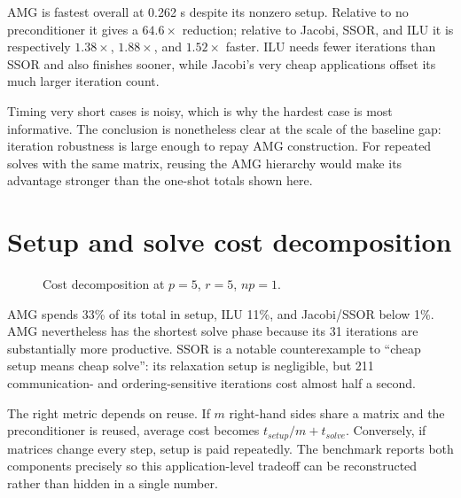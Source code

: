 \documentclass[10pt,a4paper]{article}
\begin{document}
AMG is fastest overall at 0.262 s despite its nonzero setup. Relative to no preconditioner it gives
a $64.6\times$ reduction; relative to Jacobi, SSOR, and ILU it is respectively $1.38\times$,
$1.88\times$, and $1.52\times$ faster. ILU needs fewer iterations than SSOR and also finishes
sooner, while Jacobi's very cheap applications offset its much larger iteration count.

Timing very short cases is noisy, which is why the hardest case is most informative. The conclusion
is nonetheless clear at the scale of the baseline gap: iteration robustness is large enough to repay
AMG construction. For repeated solves with the same matrix, reusing the AMG hierarchy would make
its advantage stronger than the one-shot totals shown here.

\newpage
\section{Setup and solve cost decomposition}
\begin{figure}[h]
\centering
{}
\caption{Cost decomposition at $p=5$, $r=5$, $np=1$.}
\label{fig:split}
\end{figure}

AMG spends 33\% of its total in setup, ILU 11\%, and Jacobi/SSOR below 1\%. AMG nevertheless has
the shortest solve phase because its 31 iterations are substantially more productive. SSOR is a
notable counterexample to ``cheap setup means cheap solve'': its relaxation setup is negligible,
but 211 communication- and ordering-sensitive iterations cost almost half a second.

The right metric depends on reuse. If $m$ right-hand sides share a matrix and the preconditioner is
reused, average cost becomes $t_{setup}/m+t_{solve}$. Conversely, if matrices change every step,
setup is paid repeatedly. The benchmark reports both components precisely so this application-level
tradeoff can be reconstructed rather than hidden in a single number.
\end{document}

